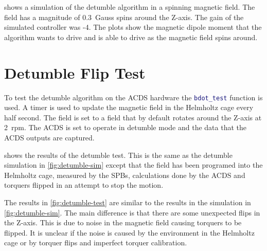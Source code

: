 
 shows a simulation of the detumble algorithm in a spinning magnetic field. The field has a magnitude of 0.3~Gauss spins around the Z-axis. The gain of the simulated controller was -4. The plots show the magnetic dipole moment that the algorithm wants to drive and is able to drive as the magnetic field spins around.


\section{Detumble Flip Test}

To test the detumble algorithm on the \ac{ACDS} hardware the \lstinline[style=code,language=Matlab]$bdot_test$ function is used. A timer is used to update the magnetic field in the Helmholtz cage every half second. The field is set to a field that by default rotates around the Z-axis at 2~rpm. The \ac{ACDS} is set to operate in detumble mode and the data that the \ac{ACDS} outputs are captured.


 shows the results of the detumble test. This is the same as the detumble simulation in \cref{fig:detumble-sim} except that the field has been programed into the Helmholtz cage, measured by the \acp{SPB}, calculations done by the \ac{ACDS} and torquers flipped in an attempt to stop the motion.

The results in \cref{fig:detumble-test} are similar to the results in the simulation in \cref{fig:detumble-sim}. The main difference is that there are some unexpected flips in the Z-axis. This is due to noise in the magnetic field causing torquers to be flipped. It is unclear if the noise is caused by the environment in the Helmholtz cage or by torquer flips and imperfect torquer calibration.


